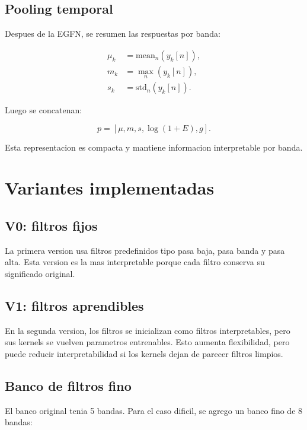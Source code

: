 \documentclass[11pt,letterpaper]{article}
\begin{document}
\subsection{Pooling temporal}

Despues de la EGFN, se resumen las respuestas por banda:

\begin{align}
    \mu_k &= \text{mean}_n(y_k[n]), \\
    m_k &= \max_n(y_k[n]), \\
    s_k &= \text{std}_n(y_k[n]).
\end{align}

Luego se concatenan:

\begin{equation}
    p = [\mu, m, s, \log(1+E), g].
\end{equation}

Esta representacion es compacta y mantiene informacion interpretable por banda.

\section{Variantes implementadas}

\subsection{V0: filtros fijos}

La primera version usa filtros predefinidos tipo pasa baja, pasa banda y pasa
alta. Esta version es la mas interpretable porque cada filtro conserva su
significado original.

\subsection{V1: filtros aprendibles}

En la segunda version, los filtros se inicializan como filtros interpretables,
pero sus kernels se vuelven parametros entrenables. Esto aumenta flexibilidad,
pero puede reducir interpretabilidad si los kernels dejan de parecer filtros
limpios.

\subsection{Banco de filtros fino}

El banco original tenia 5 bandas. Para el caso dificil, se agrego un banco fino
de 8 bandas:
\end{document}
